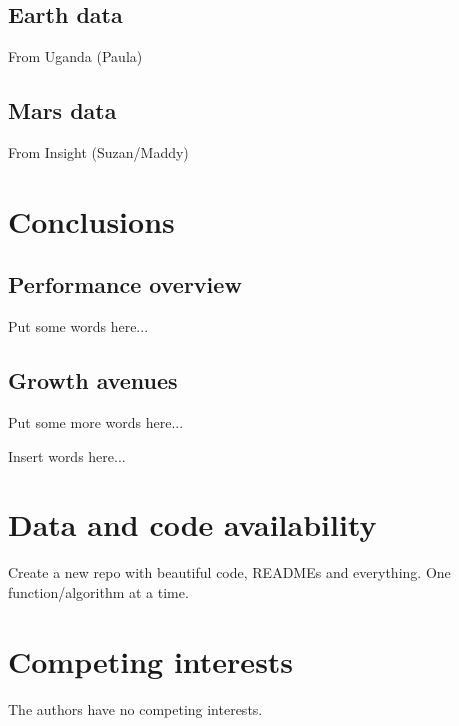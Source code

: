 \documentclass[preprint]{seismica}
\begin{document}
    \subsection{Earth data}
      From Uganda (Paula)

    \subsection{Mars data}
      From Insight (Suzan/Maddy)

\section{Conclusions} \label{sec:conclusion}

    \subsection{Performance overview}
      Put some words here...

    \subsection{Growth avenues}
      Put some more words here...

\begin{acknowledgements}
    [Suzan] Insert words here...
\end{acknowledgements}

\section*{Data and code availability}
Create a new repo with beautiful code, READMEs and everything. One function/algorithm at a time.

\section*{Competing interests}
    The authors have no competing interests.


   
\end{document}
